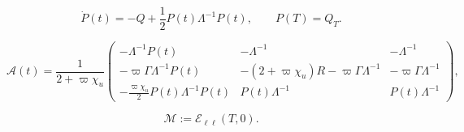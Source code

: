 \documentclass[10pt,a4paper]{amsart}
\begin{document}
\begin{equation}\label{eq:mf_riccati}
\dot P(t)
=
- Q+\frac12P(t)\Lambda^{-1}P(t),
\qquad
P(T)=Q_T.
\end{equation}

\begin{equation}\label{eq:mf_A_matrix}
\mathcal A(t)
=
\frac{1}{2+\varpi\chi_u}
\begin{pmatrix}
-\Lambda^{-1}P(t)&-\Lambda^{-1}&-\Lambda^{-1}\\
-\varpi\Gamma\Lambda^{-1}P(t)&
-(2+\varpi\chi_u)R-\varpi\Gamma\Lambda^{-1}&
-\varpi\Gamma\Lambda^{-1}\\
-\frac{\varpi\chi_u}{2}P(t)\Lambda^{-1}P(t)&
P(t)\Lambda^{-1}&P(t)\Lambda^{-1}
\end{pmatrix},
\end{equation}

\begin{equation}\label{eq:mf_matching_matrix}
\mathcal M:=\mathcal E_{\ell\ell}(T,0).
\end{equation}
\end{document}
